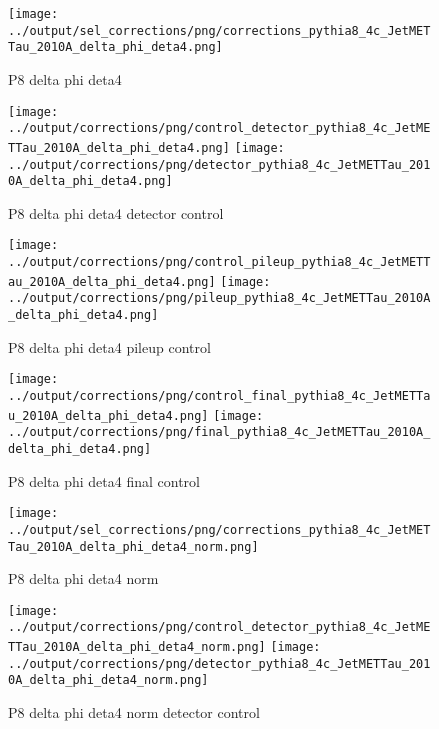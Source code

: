 \documentclass[11pt]{book}
\begin{document}
\begin{figure}[ht]
\centering
\texttt{[image: ../output/sel\_corrections/png/corrections\_pythia8\_4c\_JetMETTau\_2010A\_delta\_phi\_deta4.png]}
\caption{P8 delta phi deta4}
\label{fig:p8_JetMETTau_2010A_delta_phi_deta4}
\end{figure}


\begin{figure}[ht]
\centering
\texttt{[image: ../output/corrections/png/control\_detector\_pythia8\_4c\_JetMETTau\_2010A\_delta\_phi\_deta4.png]}
\texttt{[image: ../output/corrections/png/detector\_pythia8\_4c\_JetMETTau\_2010A\_delta\_phi\_deta4.png]}
\caption{P8 delta phi deta4 detector control}
\label{fig:p8_JetMETTau_2010A_delta_phi_deta4_detector_control}
\end{figure}

\begin{figure}[ht]
\centering
\texttt{[image: ../output/corrections/png/control\_pileup\_pythia8\_4c\_JetMETTau\_2010A\_delta\_phi\_deta4.png]}
\texttt{[image: ../output/corrections/png/pileup\_pythia8\_4c\_JetMETTau\_2010A\_delta\_phi\_deta4.png]}
\caption{P8 delta phi deta4 pileup control}
\label{fig:p8_JetMETTau_2010A_delta_phi_deta4_pileup_control}
\end{figure}


\begin{figure}[ht]
\centering
\texttt{[image: ../output/corrections/png/control\_final\_pythia8\_4c\_JetMETTau\_2010A\_delta\_phi\_deta4.png]}
\texttt{[image: ../output/corrections/png/final\_pythia8\_4c\_JetMETTau\_2010A\_delta\_phi\_deta4.png]}
\caption{P8 delta phi deta4 final control}
\label{fig:p8_JetMETTau_2010A_delta_phi_deta4_final_control}
\end{figure}


\begin{figure}[ht]
\centering
\texttt{[image: ../output/sel\_corrections/png/corrections\_pythia8\_4c\_JetMETTau\_2010A\_delta\_phi\_deta4\_norm.png]}
\caption{P8 delta phi deta4 norm}
\label{fig:p8_JetMETTau_2010A_delta_phi_deta4_norm}
\end{figure}

\begin{figure}[ht]
\centering
\texttt{[image: ../output/corrections/png/control\_detector\_pythia8\_4c\_JetMETTau\_2010A\_delta\_phi\_deta4\_norm.png]}
\texttt{[image: ../output/corrections/png/detector\_pythia8\_4c\_JetMETTau\_2010A\_delta\_phi\_deta4\_norm.png]}
\caption{P8 delta phi deta4 norm detector control}
\label{fig:p8_JetMETTau_2010A_delta_phi_deta4_norm_detector_control}
\end{figure}
\end{document}
